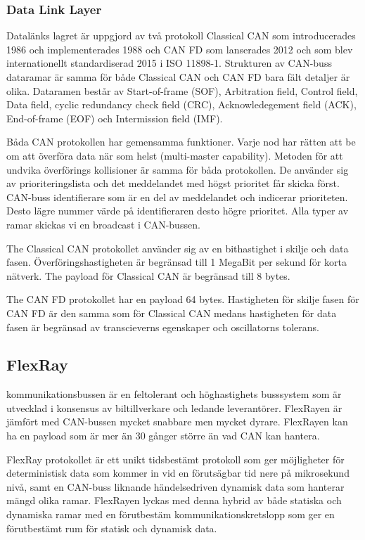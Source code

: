 \documentclass[a4paper]{IEEEtran}
\begin{document}
\subsubsection{Data Link Layer}
Datalänks lagret är uppgjord av två protokoll Classical CAN som introducerades 1986 och implementerades 1988 och CAN FD som lanserades 2012 och som blev internationellt standardiserad 2015 i ISO 11898-1. Strukturen av CAN-buss dataramar är samma för både Classical CAN och CAN FD bara fält detaljer är olika. Dataramen består av Start-of-frame (SOF), Arbitration field, Control field, Data field, cyclic redundancy check field (CRC), Acknowledegement field (ACK), End-of-frame (EOF) och Intermission field (IMF). 

Båda CAN protokollen har gemensamma funktioner. Varje nod har rätten att be om att överföra data när som helst (multi-master capability). Metoden för att undvika överförings kollisioner är samma för båda protokollen. De använder sig av prioriteringslista och det meddelandet med högst prioritet får skicka först. CAN-buss identifierare som är en del av meddelandet och indicerar prioriteten. Desto lägre nummer värde på identifieraren desto högre prioritet. Alla typer av ramar skickas vi en broadcast i CAN-bussen. 

The Classical CAN protokollet använder sig av en bithastighet i skilje och data fasen. Överföringshastigheten är begränsad till 1 MegaBit per sekund för korta nätverk. The payload för Classical CAN är begränsad till 8 bytes.

The CAN FD protokollet har en payload 64 bytes. Hastigheten för skilje fasen för CAN FD är den samma som för Classical CAN medans hastigheten för data fasen är begränsad av transcieverns egenskaper och oscillatorns tolerans. \cite{CANdata}

\subsection{FlexRay} \label{sec:FlexRay}
kommunikationsbussen är en feltolerant och höghastighets busssystem som är utvecklad i konsensus av biltillverkare och ledande leverantörer. FlexRayen är jämfört med CAN-bussen mycket snabbare men mycket dyrare. FlexRayen kan ha en payload som är mer än 30 gånger större än vad CAN kan hantera.

FlexRay protokollet är ett unikt tidsbestämt protokoll som ger möjligheter för deterministisk data som kommer in vid en förutsägbar tid nere på mikrosekund nivå, samt en CAN-buss liknande händelsedriven dynamisk data som hanterar mängd olika ramar. FlexRayen lyckas med denna hybrid av både statiska och dynamiska ramar med en förutbestäm kommunikationskretslopp som ger en förutbestämt rum för statisk och dynamisk data. 
\end{document}
